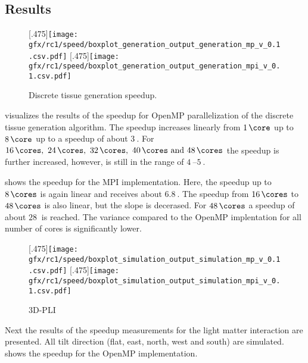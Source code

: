 \subsection{Results}
% 
\begin{figure}[!t]
\centering
{}[.475\textwidth]{\texttt{[image: gfx/rc1/speed/boxplot\_generation\_output\_generation\_mp\_v\_0.1.csv.pdf]}}
\hfill
{}[.475\textwidth]{\texttt{[image: gfx/rc1/speed/boxplot\_generation\_output\_generation\_mpi\_v\_0.1.csv.pdf]}}
\caption{Discrete tissue generation speedup. }
\end{figure}
%
 visualizes the results of the speedup for \ac{OpenMP} parallelization of the discrete tissue generation algorithm.
The speedup increases linearly from $\SI{1}{\core}$ up to $\SI{8}{\core}$ up to a speedup of about $\SI{3}{}$.
For $\SIlist{16;24;32;40;48}{\cores}$ the speedup is further increased, however, is still in the range of $\SIrange{4}{5}{}$.
\par
% 
 shows the speedup for the \ac{MPI} implementation.
Here, the speedup up to $\SI{8}{\cores}$ is again linear and receives about $\SI{6.8}{}$.
The speedup from $\SI{16}{\cores}$ to $\SI{48}{\cores}$ is also linear, but the slope is decerased.
For $\SI{48}{\cores}$ a speedup of about $\SI{28}{}$ is reached.
The variance compared to the \ac{OpenMP} implentation for all number of cores is significantly lower.
\par
% 
\begin{figure}[!t]
\centering
{}[.475\textwidth]{\texttt{[image: gfx/rc1/speed/boxplot\_simulation\_output\_simulation\_mp\_v\_0.1.csv.pdf]}}
\hfill
{}[.475\textwidth]{\texttt{[image: gfx/rc1/speed/boxplot\_simulation\_output\_simulation\_mpi\_v\_0.1.csv.pdf]}}
\caption{\ac{3D-PLI}}
\end{figure}
%
Next the results of the speedup measurements for the light matter interaction are presented.
All tilt direction (flat, east, north, west and south) are simulated.
 shows the speedup for the \ac{OpenMP} implementation.
